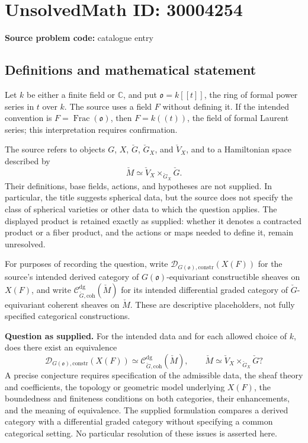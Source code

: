 \documentclass[11pt]{article}
\newcommand{\C}{\mathbb{C}}
\begin{document}
\section*{UnsolvedMath ID: 30004254}
\textbf{Source problem code:} catalogue entry
\subsection{Definitions and mathematical statement}
Let \(k\) be either a finite field or \(\C\), and put \(\mathfrak o=k[[t]]\), the ring of formal power series in \(t\) over \(k\). The source uses a field \(F\) without defining it. If the intended convention is \(F=\operatorname{Frac}(\mathfrak o)\), then \(F=k((t))\), the field of formal Laurent series; this interpretation requires confirmation.

The source refers to objects \(G\), \(X\), \(\check G\), \(\check G_X\), and \(\check V_X\), and to a Hamiltonian space described by
\[
\check M\simeq\check V_X\times_{\check G_X}\check G.
\]
Their definitions, base fields, actions, and hypotheses are not supplied. In particular, the title suggests spherical data, but the source does not specify the class of spherical varieties or other data to which the question applies. The displayed product is retained exactly as supplied: whether it denotes a contracted product or a fiber product, and the actions or maps needed to define it, remain unresolved.

For purposes of recording the question, write \(\mathcal D_{G(\mathfrak o),\mathrm{constr}}(X(F))\) for the source's intended derived category of \(G(\mathfrak o)\)-equivariant constructible sheaves on \(X(F)\), and write \(\mathcal C^{\mathrm{dg}}_{\check G,\mathrm{coh}}(\check M)\) for its intended differential graded category of \(\check G\)-equivariant coherent sheaves on \(\check M\). These are descriptive placeholders, not fully specified categorical constructions.

\textbf{Question as supplied.} For the intended data and for each allowed choice of \(k\), does there exist an equivalence
\[
\mathcal D_{G(\mathfrak o),\mathrm{constr}}(X(F))
\simeq
\mathcal C^{\mathrm{dg}}_{\check G,\mathrm{coh}}(\check M),
\qquad
\check M\simeq\check V_X\times_{\check G_X}\check G?
\]
A precise conjecture requires specification of the admissible data, the sheaf theory and coefficients, the topology or geometric model underlying \(X(F)\), the boundedness and finiteness conditions on both categories, their enhancements, and the meaning of equivalence. The supplied formulation compares a derived category with a differential graded category without specifying a common categorical setting. No particular resolution of these issues is asserted here.
\end{document}
